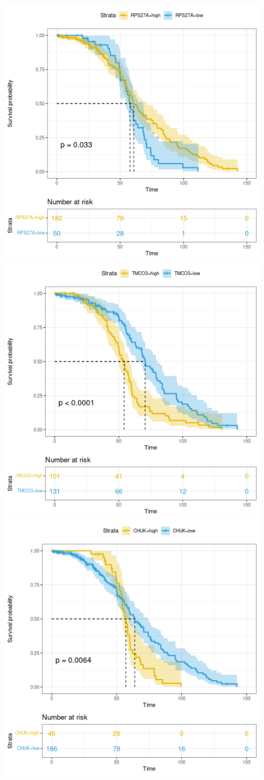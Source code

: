 \documentclass[fleqn,10pt]{SelfArx} %
\begin{document}
\begin{figure}[ht]
\begin{multicols}{2}
		 			\includegraphics[width=0.7\linewidth]{figures/RPS27A.png}
				 	\includegraphics[width=0.7\linewidth]{figures/TMCO3.png}
		 			\includegraphics[width=0.7\linewidth]{figures/CHUK.png}

\end{multicols}
\end{figure}
\end{document}
